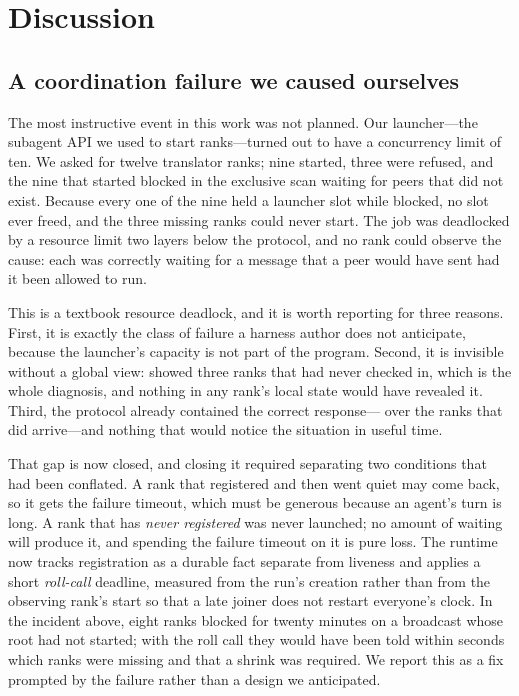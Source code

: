 \section{Discussion}
\label{sec:discussion}

\subsection{A coordination failure we caused ourselves}
\label{sec:discussion-deadlock}

The most instructive event in this work was not planned. Our launcher---the
subagent API we used to start ranks---turned out to have a concurrency limit
of ten. We asked for twelve translator ranks; nine started, three were
refused, and the nine that started blocked in the exclusive scan waiting for
peers that did not exist. Because every one of the nine held a launcher
slot while blocked, no slot ever freed, and the three missing ranks could
never start. The job was deadlocked by a resource limit two layers below
the protocol, and no rank could observe the cause: each was correctly
waiting for a message that a peer would have sent had it been allowed to
run.

This is a textbook resource deadlock, and it is worth reporting for three
reasons. First, it is exactly the class of failure a harness author does not
anticipate, because the launcher's capacity is not part of the program.
Second, it is invisible without a global view:  showed
three ranks that had never checked in, which is the whole diagnosis, and
nothing in any rank's local state would have revealed it. Third, the
protocol already contained the correct response--- over the
ranks that did arrive---and nothing that would notice the situation in
useful time.

That gap is now closed, and closing it required separating two conditions
that had been conflated. A rank that registered and then went quiet may come
back, so it gets the failure timeout, which must be generous because an
agent's turn is long. A rank that has \emph{never registered} was never
launched; no amount of waiting will produce it, and spending the failure
timeout on it is pure loss. The runtime now tracks registration as a durable
fact separate from liveness and applies a short \emph{roll-call} deadline,
measured from the run's creation rather than from the observing rank's start
so that a late joiner does not restart everyone's clock. In the incident
above, eight ranks blocked for twenty minutes on a broadcast whose root had
not started; with the roll call they would have been told within seconds
which ranks were missing and that a shrink was required. We report this as a
fix prompted by the failure rather than a design we anticipated.

